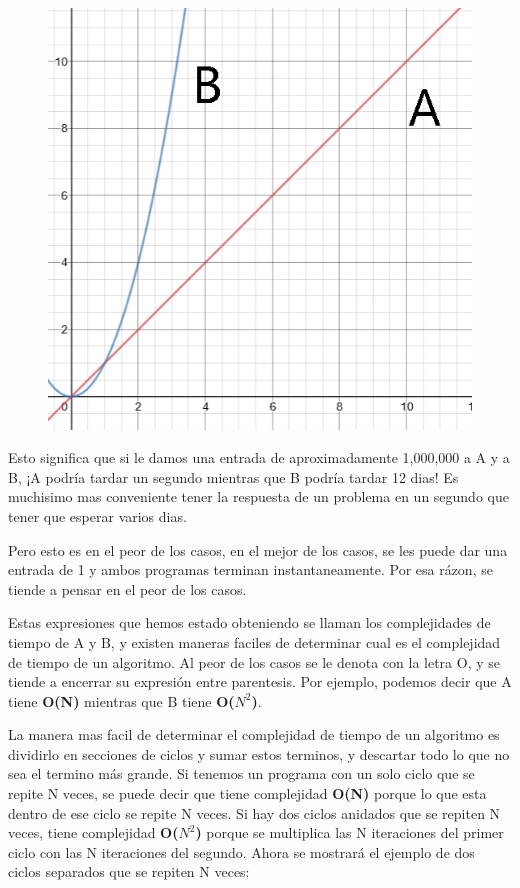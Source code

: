 \documentclass{article}
\begin{document}
\begin{figure}[H]
    \centering
    \includegraphics[width=0.3\paperwidth]{nsquared}
\end{figure}

Esto significa que si le damos una entrada de aproximadamente 1,000,000 a A y a B, ¡A podría tardar un segundo mientras que B podría tardar 12 dias! Es muchisimo mas conveniente tener la respuesta de un problema en un segundo que tener que esperar varios dias.

Pero esto es en el peor de los casos, en el mejor de los casos, se les puede dar una entrada de 1 y ambos programas terminan instantaneamente. Por esa rázon, se tiende a pensar en el peor de los casos.

Estas expresiones que hemos estado obteniendo se llaman los complejidades de tiempo de A y B, y existen maneras faciles de determinar cual es el complejidad de tiempo de un algoritmo. Al peor de los casos se le denota con la letra O, y se tiende a encerrar su expresión entre parentesis. Por ejemplo, podemos decir que A tiene \textbf{O(N)} mientras que B tiene \textbf{O($N^2$)}.

La manera mas facil de determinar el complejidad de tiempo de un algoritmo es dividirlo en secciones de ciclos y sumar estos terminos, y descartar todo lo que no sea el termino más grande. Si tenemos un programa con un solo ciclo que se repite N veces, se puede decir que tiene complejidad \textbf{O(N)} porque lo que esta dentro de ese ciclo se repite N veces. Si hay dos ciclos anidados que se repiten N veces, tiene complejidad \textbf{O($N^2$)} porque se multiplica las N iteraciones del primer ciclo con las N iteraciones del segundo. Ahora se mostrará el ejemplo de dos ciclos separados que se repiten N veces:
\end{document}
